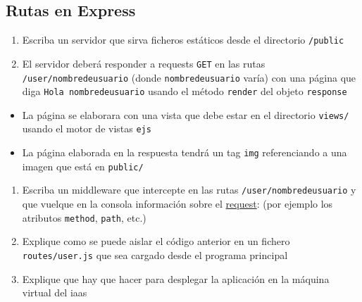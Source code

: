 \subsection{Rutas en Express}\label{rutas-en-express}

\begin{enumerate}
\def\labelenumi{\arabic{enumi}.}
\itemsep1pt\parskip0pt
\item
  Escriba un servidor que sirva ficheros estáticos desde el directorio
  \texttt{/public}
\item
  El servidor deberá responder a requests \texttt{GET} en las rutas
  \texttt{/user/nombredeusuario} (donde \texttt{nombredeusuario} varía)
  con una página que diga \texttt{Hola nombredeusuario} usando el método
  \texttt{render} del objeto \texttt{response}
\end{enumerate}

\begin{itemize}
\itemsep1pt\parskip0pt
\item
  La página se elaborara con una vista que debe estar en el directorio
  \texttt{views/} usando el motor de vistas \texttt{ejs}
\item
  La página elaborada en la respuesta tendrá un tag \texttt{img}
  referenciando a una imagen que está en \texttt{public/}
\end{itemize}

\begin{enumerate}
\def\labelenumi{\arabic{enumi}.}
\setcounter{enumi}{2}
\itemsep1pt\parskip0pt
\item
  Escriba un middleware que intercepte en las rutas
  \texttt{/user/nombredeusuario} y que vuelque en la consola información
  sobre el \href{https://expressjs.com/en/4x/api.html\#req}{request}:
  (por ejemplo los atributos \texttt{method}, \texttt{path}, etc.)
\item
  Explique como se puede aislar el código anterior en un fichero
  \texttt{routes/user.js} que sea cargado desde el programa principal
\item
  Explique que hay que hacer para desplegar la aplicación en la máquina
  virtual del iaas
\end{enumerate}
